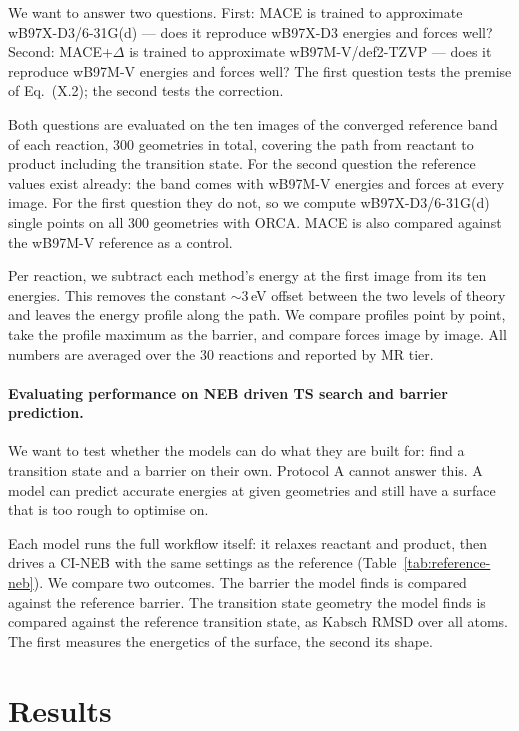 We want to answer two questions. First: MACE is trained to approximate
wB97X-D3/6-31G(d) --- does it reproduce wB97X-D3 energies and forces well?
Second: MACE+$\Delta$ is trained to approximate wB97M-V/def2-TZVP --- does
it reproduce wB97M-V energies and forces well? The first question tests the
premise of Eq.~(X.2); the second tests the correction.

Both questions are evaluated on the ten images of the converged reference
band of each reaction, 300 geometries in total, covering the path from
reactant to product including the transition state. For the second question
the reference values exist already: the band comes with wB97M-V energies
and forces at every image. For the first question they do not, so we
compute wB97X-D3/6-31G(d) single points on all 300 geometries with ORCA.
MACE is also compared against the wB97M-V reference as a control.

Per reaction, we subtract each method's energy at the first image from its
ten energies. This removes the constant ${\sim}3$\,eV offset between the
two levels of theory and leaves the energy profile along the path. We
compare profiles point by point, take the profile maximum as the barrier,
and compare forces image by image. All numbers are averaged over the 30
reactions and reported by MR tier.

\paragraph{Evaluating performance on NEB driven TS search and barrier prediction.}
We want to test whether the models can do what they are built for: find a transition
state and a barrier on their own. Protocol A cannot answer this. A model can predict accurate energies at
given geometries and still have a surface that is too rough to optimise on.

Each model runs the full workflow itself: it relaxes reactant and product,
then drives a CI-NEB with the same settings as the reference
(Table~\ref{tab:reference-neb}). We compare two outcomes. The barrier the
model finds is compared against the reference barrier. The transition state geometry
the model finds is compared against the reference transition state, as
Kabsch RMSD over all atoms. The first measures the energetics of the
surface, the second its shape.

\section{Results}

